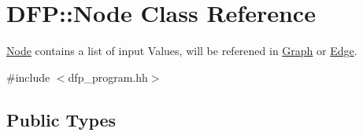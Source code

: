 \hypertarget{class_d_f_p_1_1_node}{}\section{D\+FP\+:\+:Node Class Reference}
\label{class_d_f_p_1_1_node}


\hyperlink{class_d_f_p_1_1_node}{Node} contains a list of input Values, will be referened in \hyperlink{class_d_f_p_1_1_graph}{Graph} or \hyperlink{class_d_f_p_1_1_edge}{Edge}.  




{\ttfamily \#include $<$dfp\+\_\+program.\+hh$>$}

\subsection*{Public Types}
